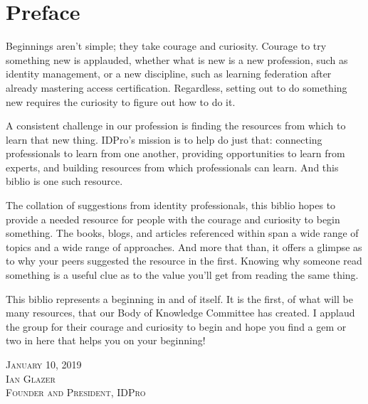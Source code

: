 \section{Preface}

Beginnings aren’t simple; they take courage and curiosity. Courage to try something new is applauded, whether what is new is a new profession, such as  identity management, or a new discipline, such as learning federation after already mastering access certification. Regardless, setting out to do something new requires the curiosity to figure out how to do it.

A consistent challenge in our profession is finding the resources from which to learn that new thing. IDPro’s mission is to help do just that: connecting professionals to learn from one another, providing opportunities to learn from experts, and building resources from which professionals can learn. And this biblio is one such resource.

The collation of suggestions from identity professionals, this biblio hopes to provide a needed resource for people with the courage and curiosity to begin something. The books, blogs, and articles referenced within span a wide range of topics and a wide range of approaches. And more that than, it offers a glimpse as to why your peers suggested the resource in the first. Knowing why someone read something is a useful clue as to the value you’ll get from reading the same thing.

This biblio represents a beginning in and of itself. It is the first, of what will be many resources, that our Body of Knowledge Committee has created. I applaud the group for their courage and curiosity to begin and hope you find a gem or two in here that helps you on your beginning!

\vspace{24pt}
{\setlength{\parindent}{0cm}
\textsc{
January 10, 2019\\
Ian Glazer\\
Founder and President, IDPro}
}